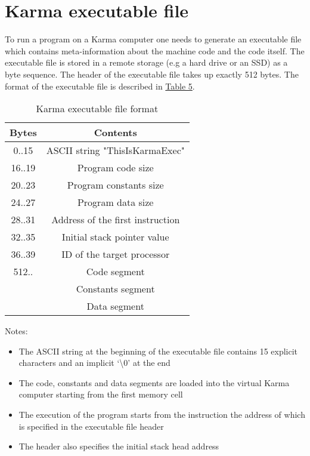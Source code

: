 \documentclass{article}
\newcommand{\St}[1]{{\fontfamily{qcr}\selectfont #1}}
\begin{document}
\newpage

\section{\St{Karma} executable file}

To run a program on a \St{Karma} computer one needs to generate an executable file which contains meta-information about the machine code and the code itself. The executable file is stored in a remote storage (e.g a hard drive or an SSD) as a byte sequence. The header of the executable file takes up exactly 512 bytes. The format of the executable file is described in \hyperlink{flags:bits}{Table 5}.

\hypertarget{executable:format}{}
{
\renewcommand{\arraystretch}{1.4}
\begin{table}[h!]
\centering
\caption{\St{Karma} executable file format}
\vspace{2mm}
\begin{tabular}{| c | c |}
 \hline
 Bytes & Contents \\
 \hline
 0..15 & \St{ASCII} string "ThisIsKarmaExec" \\
 16..19 & Program code size \\
 20..23 & Program constants size \\
 24..27 & Program data size \\
 28..31 & Address of the first instruction \\
 32..35 & Initial stack pointer value \\
 36..39 & ID of the target processor \\
 512.. & Code segment \\
 & Constants segment \\
 & Data segment \\
 \hline
\end{tabular}
\end{table}
}

Notes:

\begin{itemize}
	\item The \St{ASCII} string at the beginning of the executable file contains 15 explicit characters and an implicit \lq\textbackslash 0\rq{} at the end
	\item The code, constants and data segments are loaded into the virtual \St{Karma} computer starting from the first memory cell
	\item The execution of the program starts from the instruction the address of which is specified in the executable file header
	\item The header also specifies the initial stack head address
\end{itemize}
\end{document}
